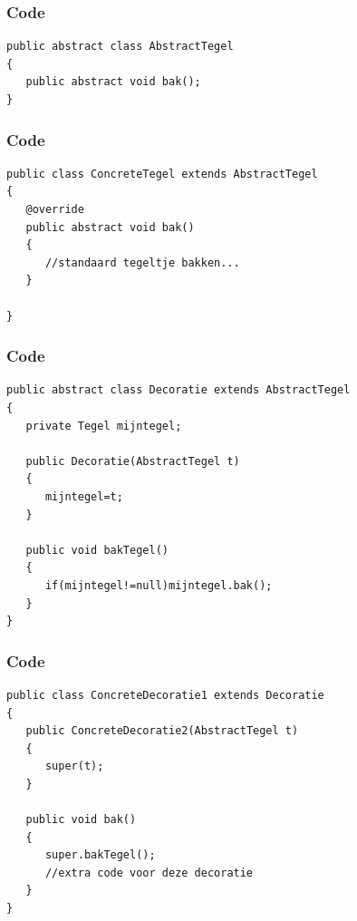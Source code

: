 \documentclass{beamer}
\begin{document}
\begin{frame}[fragile]
\frametitle{Code}
\begin{verbatim}
public abstract class AbstractTegel
{
   public abstract void bak();
}
\end{verbatim}
\end{frame}

\begin{frame}[fragile]
\frametitle{Code}
\begin{verbatim}
public class ConcreteTegel extends AbstractTegel
{
   @override
   public abstract void bak()
   {
      //standaard tegeltje bakken...
   }

}
\end{verbatim}
\end{frame}


\begin{frame}[fragile]
\frametitle{Code}
\begin{verbatim}
public abstract class Decoratie extends AbstractTegel
{
   private Tegel mijntegel;

   public Decoratie(AbstractTegel t)
   {
      mijntegel=t;    
   }
   
   public void bakTegel()
   {
      if(mijntegel!=null)mijntegel.bak();
   }
}
\end{verbatim}
\end{frame}



\begin{frame}[fragile]
\frametitle{Code}
\begin{verbatim}
public class ConcreteDecoratie1 extends Decoratie
{
   public ConcreteDecoratie2(AbstractTegel t)
   {
      super(t);
   }

   public void bak()
   {
      super.bakTegel();
      //extra code voor deze decoratie
   }   
}
\end{verbatim}
\end{frame}
\end{document}
